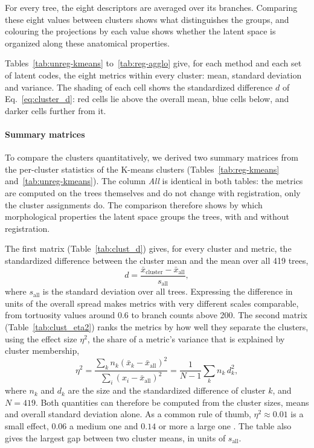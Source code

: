 For every tree, the eight descriptors are averaged over its branches. Comparing these eight values between clusters shows what distinguishes the groups, and colouring
the projections by each value shows whether the latent space is organized along these
anatomical properties.

Tables~\ref{tab:unreg-kmeans} to~\ref{tab:reg-agglo} give, for each method and each set of
latent codes, the eight metrics within every cluster: mean, standard deviation and variance. The shading of each cell shows the standardized difference $d$ of
Eq.~\eqref{eq:cluster_d}: red cells lie above the overall mean, blue cells below, and darker cells
further from it.

\paragraph{Summary matrices}             %
To compare the clusters quantitatively, we derived two summary matrices from the per-cluster
statistics of the K-means clusters (Tables~\ref{tab:reg-kmeans} and~\ref{tab:unreg-kmeans}).
The column \emph{All} is identical in both tables: the metrics are computed on the trees
themselves and do not change with registration, only the cluster assignments do. The comparison
therefore shows by which morphological properties the latent space groups the trees, with and
without registration.

The first matrix (Table~\ref{tab:clust_d}) gives, for every cluster and metric, the
standardized difference between the cluster mean and the mean over all 419 trees,
\begin{equation}
  d = \frac{\bar{x}_{\text{cluster}} - \bar{x}_{\text{all}}}{s_{\text{all}}} ,
  \label{eq:cluster_d}                   %
\end{equation}
where $s_{\text{all}}$ is the standard deviation over all trees. Expressing the difference in
units of the overall spread makes metrics with very different scales comparable, from tortuosity
values around 0.6 to branch counts above 200. The second matrix (Table~\ref{tab:clust_eta2})
ranks the metrics by how well they separate the clusters, using the effect size $\eta^2$, the
share of a metric's variance that is explained by cluster membership,
\begin{equation}
  \eta^2 = \frac{\sum_{k} n_k \left(\bar{x}_k - \bar{x}_{\text{all}}\right)^2}
                {\sum_{i} \left(x_i - \bar{x}_{\text{all}}\right)^2}
         = \frac{1}{N-1} \sum_{k} n_k\, d_k^2 ,
  \label{eq:eta2}                        %
\end{equation}
where $n_k$ and $d_k$ are the size and the standardized difference of cluster $k$, and
$N = 419$. Both quantities can therefore be computed from the cluster sizes, means and overall
standard deviation alone. As a common rule of thumb, $\eta^2 \approx 0.01$ is a small effect,
$0.06$ a medium one and $0.14$ or more a large one \cite{cohen1988}. The table also gives the
largest gap between two cluster means, in units of $s_{\text{all}}$.

